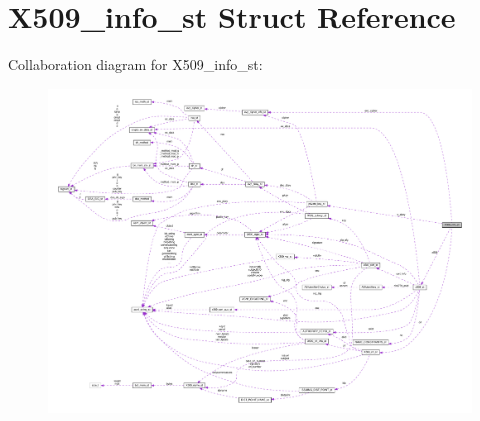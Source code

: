 \hypertarget{structX509__info__st}{}\section{X509\+\_\+info\+\_\+st Struct Reference}
\label{structX509__info__st}


Collaboration diagram for X509\+\_\+info\+\_\+st\+:
\nopagebreak
\begin{figure}[H]
\begin{center}
\leavevmode
\includegraphics[width=350pt]{structX509__info__st__coll__graph}
\end{center}
\end{figure}
